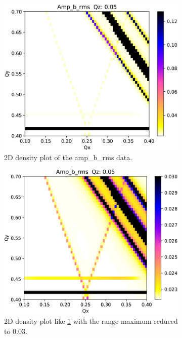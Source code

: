 \documentclass{hitec}
\begin{document}
{{{{{{{{{{{{{{{\begin{figure}[tb]
  \centering
  \begin{subfigure}[t]{0.49\textwidth}
    \includegraphics[width=\textwidth]{ts_plot1.pdf}
    \caption{2D density plot of the amp_b_rms data.}
    \label{f:plot1}
  \end{subfigure}
  \hfil
  \begin{subfigure}[t]{0.49\textwidth}
    \includegraphics[width=\textwidth]{ts_plot2.pdf}
    \caption{2D density plot like \ref{f:plot1} with the range maximum reduced to 0.03.}
    \label{f:plot2}
  \end{subfigure}
  \caption{}
  \label{f:plot}
\end{figure}

}}}}}}}}}}}}}}}
\end{document}
